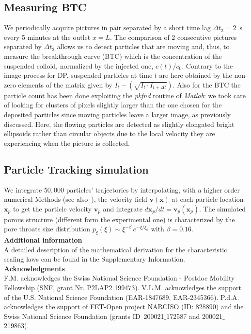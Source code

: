 \documentclass[singlecolumn,pre,notitlepage,preprintnumbers,floatfix,superscriptaddress]{revtex4-1}
\begin{document}
\subsection*{Measuring BTC}
\noindent
We periodically acquire pictures in pair separated by a short time lag $\Delta t_2 = 2$~s every 5 minutes at the outlet $x = L$. The comparison of 2 consecutive pictures separated by $\Delta t_2$ allows us to detect particles that are moving and, thus, to measure the breakthrough curve (BTC) which is the concentration of the suspended colloid, normalized by the injected one, $c(t)/c_0$. Contrary to the image process for DP, suspended particles at time $t$ are here obtained by the non-zero elements of the matrix given by $I_t - \left( \sqrt{I_t \cdot I_{t+\Delta t}}\right)$. Also for the BTC the particle count has been done exploiting the \emph{pkfnd} routine of \emph{Matlab}: we took care of looking for clusters of pixels slightly larger than the one chosen for the deposited particles since moving particles leave a larger image, as previously discussed. Here, the flowing particles are detected as slightly elongated bright ellipsoids rather than circular objects due to the local velocity they are experiencing when the picture is collected. \\

\subsection*{Particle Tracking simulation}
\noindent
We integrate $50,000$ particles' trajectories by interpolating, with a higher order numerical Methods (see also~\cite{deAnnaPRF2017}), the velocity field $\boldsymbol{v}(\boldsymbol{x})$ at each particle location $\boldsymbol{x}_p$ to get the particle velocity $\boldsymbol{v}_p$ and integrate $d \boldsymbol{x}_p /dt = \boldsymbol{v}_p(\boldsymbol{x}_p)$. The simulated porous structure (different form the experimental one) is characterized by the pore throats size distribution $p_\xi(\xi) \sim \xi^{-\beta} \, e^{-\xi/\xi_0}$ with $\beta = 0.16$.\\

\noindent
\textbf{Additional information}\\
A detailed description of the mathematical derivation for the characteristic scaling laws can be found in the Supplementary Information. \\

\noindent
\textbf{Acknowledgments}\\
F.M. acknowledges the Swiss National Science Foundation - Postdoc Mobility Fellowship (SNF, grant Nr. P2LAP2$\_$199473). V.L.M. acknowledges the support of the U.S. National Science Foundation (EAR-1847689, EAR-2345366). P.d.A. acknowledges the support of FET-Open project NARCISO (ID: 828890) and the Swiss National Science Foundation (grants ID~200021$\_$172587 and 200021$\_$219863).
\end{document}
